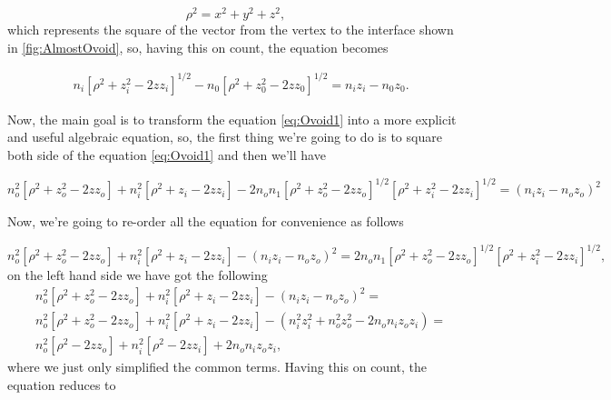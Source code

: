         \begin{equation}
            \rho^2 = x^2 + y^2 + z^2,
        \end{equation}
        which represents the square of the vector from the vertex to the interface shown in \ref{fig:AlmostOvoid}, so, having this on count, the equation  becomes
        
        \begin{align}\label{eq:Ovoid1}
            & n_i\left[\rho^2 +z_i^2 -2zz_i\right]^{1/2}- n_0\left[ \rho^2 +z_0^2 -2zz_0 \right]^{1/2} = n_iz_i - n_0z_0.
        \end{align}        

        Now, the main goal is to transform the equation \ref{eq:Ovoid1} into a more explicit and useful algebraic equation, so, the first thing we're going to do is to square both side of the equation \ref{eq:Ovoid1} and then we'll have

        \begin{equation*}
            n_o^2 \left[ \rho^2 + z_o^2 - 2zz_o \right] + n_i^2\left[  \rho^2 + z_i - 2zz_i\right] - 2n_on_1 \left[ \rho^2 + z_o^2 -2zz_o \right]^{1/2}\left[\rho^2 + z_i^2 - 2zz_i\right]^{1/2} = \left( n_iz_i - n_oz_o \right)^2
        \end{equation*}

        Now, we're going to re-order all the equation for convenience as follows

        \begin{equation*}
            n_o^2 \left[ \rho^2 + z_o^2 - 2zz_o \right] + n_i^2\left[  \rho^2 + z_i - 2zz_i\right] - \left( n_iz_i - n_oz_o \right)^2 = 2n_on_1 \left[ \rho^2 + z_o^2 -2zz_o \right]^{1/2}\left[\rho^2 + z_i^2 - 2zz_i\right]^{1/2},
        \end{equation*}
        on the left hand side we have got the following
        \begin{align*}
            & n_o^2 \left[ \rho^2 + z_o^2 - 2zz_o \right] + n_i^2\left[  \rho^2 + z_i - 2zz_i\right] - \left( n_iz_i - n_oz_o \right)^2 = \\
            & n_o^2 \left[ \rho^2 + z_o^2 - 2zz_o \right] + n_i^2\left[  \rho^2 + z_i - 2zz_i\right] - \left( n_i^2z_i^2 + n_o^2z_o^2 - 2n_on_iz_oz_i \right) = \\
            & n_o^2\left[ \rho^2 - 2zz_o \right] + n_i^2\left[ \rho^2 - 2zz_i \right] + 2n_on_iz_oz_i,
        \end{align*}
        where we just only simplified the common terms. Having this on count, the equation reduces to

